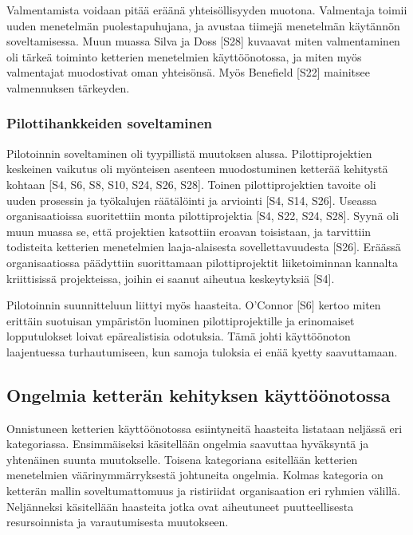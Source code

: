 Valmentamista voidaan pitää eräänä yhteisöllisyyden muotona. Valmentaja toimii
uuden menetelmän puolestapuhujana, ja avustaa tiimejä menetelmän käytännön
soveltamisessa. Muun muassa Silva ja Doss [S28] kuvaavat miten valmentaminen oli
tärkeä toiminto ketterien menetelmien käyttöönotossa, ja miten myös valmentajat
muodostivat oman yhteisönsä. Myös Benefield [S22] mainitsee valmennuksen
tärkeyden.

\subsubsection{Pilottihankkeiden soveltaminen}
\label{subsec:pilotointi}

Pilotoinnin soveltaminen oli tyypillistä muutoksen alussa. Pilottiprojektien
keskeinen vaikutus oli myönteisen asenteen muodostuminen ketterää kehitystä
kohtaan [S4, S6, S8, S10, S24, S26, S28]. Toinen pilottiprojektien tavoite oli
uuden prosessin ja työkalujen räätälöinti ja arviointi [S4, S14, S26].
Useassa organisaatioissa suoritettiin monta pilottiprojektia [S4, S22, S24,
S28]. Syynä oli muun muassa se, että projektien katsottiin eroavan toisistaan,
ja tarvittiin todisteita ketterien menetelmien laaja-alaisesta
sovellettavuudesta [S26]. Eräässä organisaatiossa päädyttiin suorittamaan
pilottiprojektit liiketoiminnan kannalta kriittisissä projekteissa, joihin ei
saanut aiheutua keskeytyksiä [S4].

Pilotoinnin suunnitteluun liittyi myös haasteita. O'Connor [S6] kertoo miten
erittäin suotuisan ympäristön luominen pilottiprojektille ja erinomaiset
lopputulokset loivat epärealistisia odotuksia. Tämä johti käyttöönoton
laajentuessa turhautumiseen, kun samoja tuloksia ei enää kyetty saavuttamaan.

\subsection{Ongelmia ketterän kehityksen käyttöönotossa}

Onnistuneen ketterien käyttöönotossa esiintyneitä haasteita listataan neljässä
eri kategoriassa. Ensimmäiseksi käsitellään ongelmia saavuttaa hyväksyntä ja
yhtenäinen suunta muutokselle. Toisena kategoriana esitellään ketterien
menetelmien väärinymmärryksestä johtuneita ongelmia. Kolmas kategoria on
ketterän mallin soveltumattomuus ja ristiriidat organisaation eri ryhmien
välillä. Neljänneksi käsitellään haasteita jotka ovat aiheutuneet
puutteellisesta resursoinnista ja varautumisesta muutokseen.

